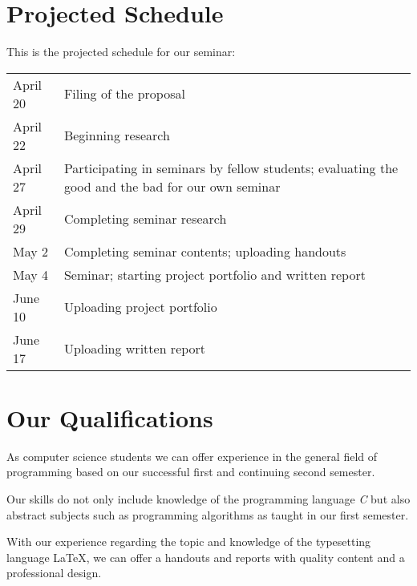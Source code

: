 \section*{Projected Schedule}
This is the projected schedule for our seminar:\\
\begin{tabular}{L{0.15} L{0.7}}
April 20 & Filing of the proposal\\
April 22 & Beginning research\\
April 27 \newline & Participating in seminars by fellow students;\newline 
evaluating the good and the bad for our own seminar\\
April 29 & Completing seminar research\\
May 2 & Completing seminar contents; uploading handouts\\
May 4 & Seminar; starting project portfolio and written report\\
June 10 & Uploading project portfolio\\
June 17 & Uploading written report
\end{tabular}
\section*{Our Qualifications}
As computer science students we can offer experience in the general field of programming based on our successful first and continuing second semester.

Our skills do not only include knowledge of the programming language \emph{C} but also abstract subjects such as programming algorithms as taught in our first semester.

With our experience regarding the topic and knowledge of the typesetting language \LaTeX, we can offer a handouts and reports with quality content and a professional design.
 
